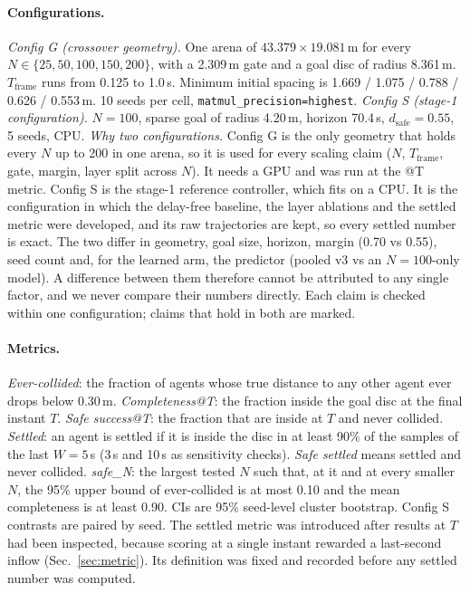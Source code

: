 \documentclass{article}
\newcommand{\Tf}{T_{\mathrm{frame}}}
\newcommand{\dsafe}{d_{\mathrm{safe}}}
\begin{document}
\paragraph{Configurations.}
\emph{Config G (crossover geometry).} One arena of $43.379\times19.081$\,m for every
$N\in\{25,50,100,150,200\}$, with a 2.309\,m gate and a goal disc of radius 8.361\,m. $\Tf$ runs
from 0.125 to 1.0\,s. Minimum initial spacing is 1.669 / 1.075 / 0.788 / 0.626 / 0.553\,m.
10 seeds per cell, \texttt{matmul\_precision=highest}.
\emph{Config S (stage-1 configuration).} $N=100$, sparse goal of radius 4.20\,m, horizon 70.4\,s,
$\dsafe=0.55$, 5 seeds, CPU.
\emph{Why two configurations.} Config G is the only geometry that holds every $N$ up to 200 in one
arena, so it is used for every scaling claim ($N$, $\Tf$, gate, margin, layer split across $N$). It
needs a GPU and was run at the @T metric. Config S is the stage-1 reference controller, which fits on
a CPU. It is the configuration in which the delay-free baseline, the layer ablations and the
settled metric were developed, and its raw trajectories are kept, so every settled number is exact.
The two differ in geometry, goal size, horizon, margin (0.70 vs 0.55), seed count and, for the
learned arm, the predictor (pooled v3 vs an $N{=}100$-only model). A difference between them
therefore cannot be attributed to any single factor, and we never compare their numbers directly.
Each claim is checked within one configuration; claims that hold in both are marked.

\paragraph{Metrics.}
\emph{Ever-collided}: the fraction of agents whose true distance to any other agent ever drops
below 0.30\,m. \emph{Completeness@T}: the fraction inside the goal disc at the final instant $T$.
\emph{Safe success@T}: the fraction that are inside at $T$ and never collided.
\emph{Settled}: an agent is settled if it is inside the disc in at least 90\% of the samples of
the last $W=5$\,s (3\,s and 10\,s as sensitivity checks). \emph{Safe settled} means settled and
never collided.
\emph{safe\_N}: the largest tested $N$ such that, at it and at every smaller $N$, the 95\% upper
bound of ever-collided is at most 0.10 and the mean completeness is at least 0.90.
CIs are 95\% seed-level cluster bootstrap. Config S contrasts are paired by seed.
The settled metric was introduced after results at $T$ had been inspected, because scoring at a
single instant rewarded a last-second inflow (Sec.~\ref{sec:metric}). Its definition was fixed and
recorded before any settled number was computed.
\end{document}
